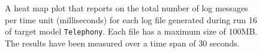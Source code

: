 \begin{figure}[htbp]
\centering
\begin{minipage}{1\textwidth}
  \centering
\end{minipage}
\caption{A heat map plot that reports on the total number of log messages per time unit (milliseconds) for each log file generated during run 16 of target model \texttt{Telephony}. Each file has a maximum size of 100MB. The results have been measured over a time span of 30 seconds.}
\label{figure:throughput_sum_random_det_telephony_16}
\end{figure}